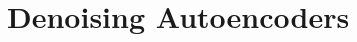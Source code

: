 \documentclass[11pt,compress,t,notes=noshow, xcolor=table]{beamer}
\begin{document}

\section{Denoising Autoencoders}
\end{document}
